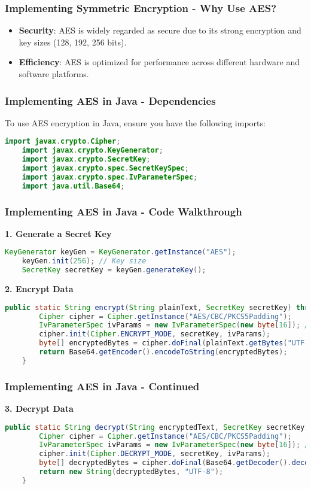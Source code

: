 \documentclass{beamer}
\begin{document}
\begin{frame}[fragile]
    \frametitle{Implementing Symmetric Encryption - Why Use AES?}
    \begin{itemize}
        \item \textbf{Security}: AES is widely regarded as secure due to its strong encryption and key sizes (128, 192, 256 bits).
        \item \textbf{Efficiency}: AES is optimized for performance across different hardware and software platforms.
    \end{itemize}
\end{frame}

\begin{frame}[fragile]
    \frametitle{Implementing AES in Java - Dependencies}
    To use AES encryption in Java, ensure you have the following imports:
    \begin{lstlisting}[language=java]
    import javax.crypto.Cipher;
    import javax.crypto.KeyGenerator;
    import javax.crypto.SecretKey;
    import javax.crypto.spec.SecretKeySpec;
    import javax.crypto.spec.IvParameterSpec;
    import java.util.Base64;
    \end{lstlisting}
\end{frame}

\begin{frame}[fragile]
    \frametitle{Implementing AES in Java - Code Walkthrough}
    \textbf{1. Generate a Secret Key}
    \begin{lstlisting}[language=java]
    KeyGenerator keyGen = KeyGenerator.getInstance("AES");
    keyGen.init(256); // Key size
    SecretKey secretKey = keyGen.generateKey();
    \end{lstlisting}
    
    \textbf{2. Encrypt Data}
    \begin{lstlisting}[language=java]
    public static String encrypt(String plainText, SecretKey secretKey) throws Exception {
        Cipher cipher = Cipher.getInstance("AES/CBC/PKCS5Padding");
        IvParameterSpec ivParams = new IvParameterSpec(new byte[16]); // Initialization vector
        cipher.init(Cipher.ENCRYPT_MODE, secretKey, ivParams);
        byte[] encryptedBytes = cipher.doFinal(plainText.getBytes("UTF-8"));
        return Base64.getEncoder().encodeToString(encryptedBytes);
    }
    \end{lstlisting}
\end{frame}

\begin{frame}[fragile]
    \frametitle{Implementing AES in Java - Continued}
    \textbf{3. Decrypt Data}
    \begin{lstlisting}[language=java]
    public static String decrypt(String encryptedText, SecretKey secretKey) throws Exception {
        Cipher cipher = Cipher.getInstance("AES/CBC/PKCS5Padding");
        IvParameterSpec ivParams = new IvParameterSpec(new byte[16]); // Same IV used for encryption
        cipher.init(Cipher.DECRYPT_MODE, secretKey, ivParams);
        byte[] decryptedBytes = cipher.doFinal(Base64.getDecoder().decode(encryptedText));
        return new String(decryptedBytes, "UTF-8");
    }
    \end{lstlisting}
\end{frame}
\end{document}
